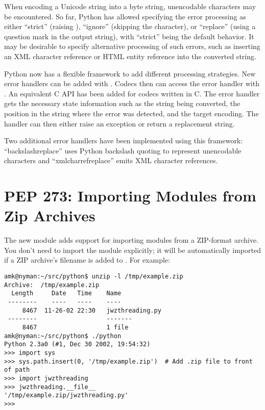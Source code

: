 \documentclass{howto}
\begin{document}
When encoding a Unicode string into a byte string, unencodable
characters may be encountered.  So far, Python has allowed specifying
the error processing as either ``strict'' (raising
), ``ignore'' (skipping the character), or
``replace'' (using a question mark in the output string), with
``strict'' being the default behavior. It may be desirable to specify
alternative processing of such errors, such as inserting an XML
character reference or HTML entity reference into the converted
string.

Python now has a flexible framework to add different processing
strategies.  New error handlers can be added with
. Codecs then can access the error
handler with . An equivalent C API has
been added for codecs written in C. The error handler gets the
necessary state information such as the string being converted, the
position in the string where the error was detected, and the target
encoding.  The handler can then either raise an exception or return a
replacement string.

Two additional error handlers have been implemented using this
framework: ``backslashreplace'' uses Python backslash quoting to
represent unencodable characters and ``xmlcharrefreplace'' emits
XML character references.

\begin{seealso}


\end{seealso}


\section{PEP 273: Importing Modules from Zip Archives}

The new  module adds support for importing
modules from a ZIP-format archive.  You don't need to import the
module explicitly; it will be automatically imported if a ZIP
archive's filename is added to .  For example:

\begin{verbatim}
amk@nyman:~/src/python$ unzip -l /tmp/example.zip
Archive:  /tmp/example.zip
  Length     Date   Time    Name
 --------    ----   ----    ----
     8467  11-26-02 22:30   jwzthreading.py
 --------                   -------
     8467                   1 file
amk@nyman:~/src/python$ ./python
Python 2.3a0 (#1, Dec 30 2002, 19:54:32) 
>>> import sys
>>> sys.path.insert(0, '/tmp/example.zip')  # Add .zip file to front of path
>>> import jwzthreading
>>> jwzthreading.__file__
'/tmp/example.zip/jwzthreading.py'
>>>
\end{verbatim}
\end{document}
